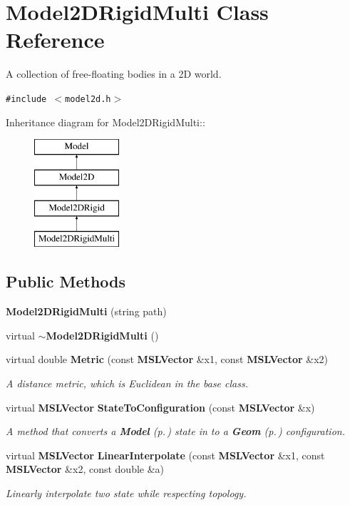 \section{Model2DRigid\-Multi  Class Reference}
\label{classModel2DRigidMulti}
A collection of free-floating bodies in a 2D world. 


{\tt \#include $<$model2d.h$>$}

Inheritance diagram for Model2DRigid\-Multi::\begin{figure}[H]
\begin{center}
\leavevmode
\includegraphics[height=4cm]{classModel2DRigidMulti}
\end{center}
\end{figure}
\subsection*{Public Methods}
\begin{CompactItemize}
\item 
{\bf Model2DRigid\-Multi} (string path)
\item 
virtual {\bf $\sim$Model2DRigid\-Multi} ()
\item 
virtual double {\bf Metric} (const {\bf MSLVector} \&x1, const {\bf MSLVector} \&x2)
\begin{CompactList}\small\item\em A distance metric, which is Euclidean in the base class.\item\end{CompactList}\item 
virtual {\bf MSLVector} {\bf State\-To\-Configuration} (const {\bf MSLVector} \&x)
\begin{CompactList}\small\item\em A method that converts a {\bf Model} {\rm (p.\,\pageref{classModel})} state in to a {\bf Geom} {\rm (p.\,\pageref{classGeom})} configuration.\item\end{CompactList}\item 
virtual {\bf MSLVector} {\bf Linear\-Interpolate} (const {\bf MSLVector} \&x1, const {\bf MSLVector} \&x2, const double \&a)
\begin{CompactList}\small\item\em Linearly interpolate two state while respecting topology.\item\end{CompactList}\end{CompactItemize}
